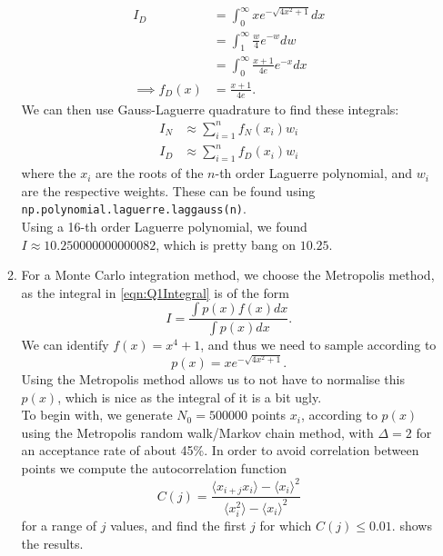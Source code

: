 \documentclass[11pt]{article}
\begin{document}
\begin{enumerate}
\begin{enumerate}
        \begin{align}
            I_D &= \int_0^\infty xe^{-\sqrt{4x^2 +1}}dx \nonumber\\
            &=\int_1^\infty \frac{w}{4}e^{-w} dw \nonumber\\
            &=\int_0^\infty \frac{x+1}{4e}e^{-x} dx \label{eqn:q1iDenominator}\\
            \implies f_D(x) &= \frac{x+1}{4e}. \label{eqn:q1iFD}
        \end{align}
        We can then use Gauss-Laguerre quadrature to find these integrals:
        \begin{align}
            I_N &\approx \sum_{i=1}^n f_N(x_i)w_i \label{eqn:GLNumerator}\\
            I_D &\approx \sum_{i=1}^n f_D(x_i)w_i \label{eqn:GLDenominator}
        \end{align}
        where the $x_i$ are the roots of the $n$-th order Laguerre polynomial, and $w_i$ are the respective weights. These can be found using \texttt{np.polynomial.laguerre.laggauss(n)}.\\
        Using a 16-th order Laguerre polynomial, we found $I \approx 10.250000000000082$, which is pretty bang on $10.25$.

        \item For a Monte Carlo integration method, we choose the Metropolis method, as the integral in \cref{eqn:Q1Integral} is of the form
        \begin{equation}
            I = \frac{\int p(x)f(x)dx}{\int p(x)dx}.
            \label{eqn:MetropolisGeneralForm}
        \end{equation}
        We can identify $f(x)=x^4+1$, and thus we need to sample according to 
        \begin{equation}
            p(x) = xe^{-\sqrt{4x^2 +1}}.
            \label{eqn:q1iiProbDist}
        \end{equation}
        Using the Metropolis method allows us to not have to normalise this $p(x)$, which is nice as the integral of it is a bit ugly.\\
        To begin with, we generate $N_0=\num[]{500000}$ points $x_i$, according to $p(x)$ using the Metropolis random walk/Markov chain method, with $\Delta=2$ for an acceptance rate of about 45\%. In order to avoid correlation between points we compute the autocorrelation function 
        \begin{equation}
            C(j) = \frac{\langle x_{i+j}x_i\rangle - \langle x_i \rangle^2}{\langle x_i^2 \rangle - \langle x_i \rangle^2}
            \label{eqn:Autocorrelation}
        \end{equation}
        for a range of $j$ values, and find the first $j$ for which $C(j)\leq 0.01$.  shows the results.


\end{enumerate}
\end{enumerate}
\end{document}
